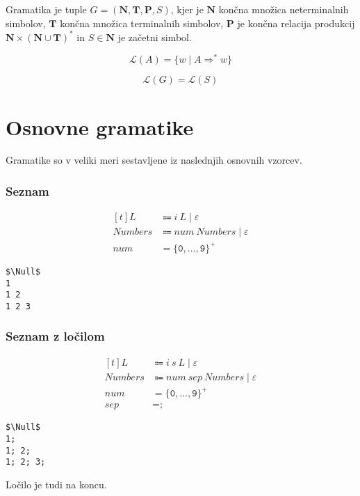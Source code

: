 \documentclass{report}
\newcommand{\Null}{\varepsilon}
\newcommand{\Language}[1]{\mathcal{L}(#1)}
\newcommand{\Char}[1]{\texttt{#1}}
\newcommand{\Spc}{\ }
\newcommand{\Union}{\mathrel{|}}
\newcommand{\Kleene}[1]{{#1}^\ast}
\newcommand{\KleenePlus}[1]{#1^+}
\newcommand{\Set}[1]{\symbf{#1}}
\newcommand{\Terminals}{\Set{T}}
\newcommand{\Productions}{\Set{P}}
\newcommand{\NonTerminals}{\Set{N}}
\newcommand{\Arrow}{\Coloneq}
\newlength{\arrow}
\newcommand{\DeriveStar}{\Rightarrow^\ast}
\newcommand{\NT}[1]{{#1}}
\newcommand{\T}[1]{{#1}}
\begin{document}
Gramatika je tuple $G = (\NonTerminals, \Terminals, \Productions, \NT{S})$, kjer je $\NonTerminals$ končna množica neterminalnih simbolov, $\Terminals$ končna množica terminalnih simbolov, $\Productions$ je končna relacija produkcij $\NonTerminals \times \Kleene{(\NonTerminals \cup \Terminals)}$ in $\NT{S} \in \NonTerminals$ je začetni simbol.

\begin{equation*}
  \Language{\NT{A}} = \{w \mid \NT{A} \DeriveStar w\}
\end{equation*}

\begin{equation*}
  \Language{G} = \Language{\NT{S}}
\end{equation*}

\section{Osnovne gramatike}
Gramatike so v veliki meri sestavljene iz naslednjih osnovnih vzorcev.

\subsubsection{Seznam}
\begin{equation*}
  \begin{aligned}[t]
    \NT{L} &\Arrow \T{i} \Spc \NT{L} \Union \Null\\[1em]
    \NT{Numbers} &\Arrow \T{num} \Spc \NT{Numbers} \Union \Null\\[1em]
    \T{num} &= \KleenePlus{\{\Char{0}, \dots, \Char{9}\}}
  \end{aligned}
\end{equation*}
\begin{lstlisting}
$\Null$
1
1 2
1 2 3
\end{lstlisting}

\subsubsection{Seznam z ločilom}
\begin{equation*}
  \begin{aligned}[t]
    \NT{L} &\Arrow \T{i} \Spc \T{s} \Spc \NT{L} \Union \Null\\[1em]
    \NT{Numbers} &\Arrow \T{num} \Spc \T{sep} \Spc \NT{Numbers} \Union \Null\\[1em]
    \T{num} &= \KleenePlus{\{\Char{0}, \dots, \Char{9}\}}\\
    \T{sep} &= \Char{;}
  \end{aligned}
\end{equation*}
\begin{lstlisting}
$\Null$
1;
1; 2;
1; 2; 3;
\end{lstlisting}
Ločilo je tudi na koncu.
\end{document}

